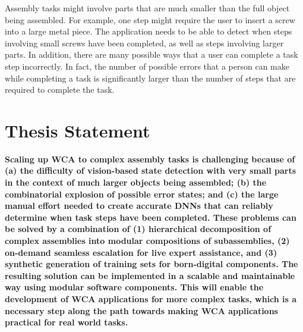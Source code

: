 Assembly tasks might involve parts that are much smaller than the full object
being assembled.
For example, one step might require the user to insert a screw into a large
metal piece.
The application needs to be able to detect when steps involving small screws
have been completed, as well as steps involving larger parts.
In addition, there are many possible ways that a user can complete a task step
incorrectly.
In fact, the number of possible errors that a person can make while completing a
task is significantly larger than the number of steps that are required to
complete the task.

\section{Thesis Statement}

\textbf{
  Scaling up WCA to complex assembly tasks is challenging because of
  (a) the difficulty of
  vision-based state detection with very small parts in the context of much
  larger objects being assembled; (b) the combinatorial explosion
  of possible error states; and (c) the large manual effort needed to create
  accurate DNNs that can reliably determine when task steps have been completed.
  These problems can be solved by a combination of (1) hierarchical
  decomposition of
  complex assemblies into modular compositions of subassemblies, (2) on-demand
  seamless
  escalation for live expert assistance, and (3) synthetic generation of
  training
  sets for born-digital components. The resulting solution can be implemented in
  a scalable and maintainable way using modular software components.
  This will enable the development of WCA applications for more complex tasks,
  which is a necessary step along the path towards making WCA applications
  practical for real world tasks.
}
